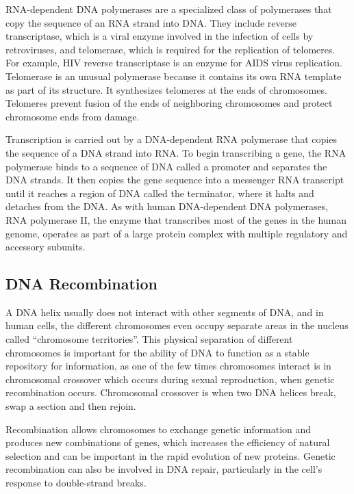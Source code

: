 RNA-dependent DNA polymerases are a specialized class of polymerases that copy the sequence of an RNA strand into DNA. They include reverse transcriptase, which is a viral enzyme involved in the infection of cells by retroviruses, and telomerase, which is required for the replication of telomeres. For example, HIV reverse transcriptase is an enzyme for AIDS virus replication. Telomerase is an unusual polymerase because it contains its own RNA template as part of its structure. It synthesizes telomeres at the ends of chromosomes. Telomeres prevent fusion of the ends of neighboring chromosomes and protect chromosome ends from damage.

Transcription is carried out by a DNA-dependent RNA polymerase that copies the sequence of a DNA strand into RNA. To begin transcribing a gene, the RNA polymerase binds to a sequence of DNA called a promoter and separates the DNA strands. It then copies the gene sequence into a messenger RNA transcript until it reaches a region of DNA called the terminator, where it halts and detaches from the DNA. As with human DNA-dependent DNA polymerases, RNA polymerase II, the enzyme that transcribes most of the genes in the human genome, operates as part of a large protein complex with multiple regulatory and accessory subunits.

\hypertarget{dna-recombination}{%
\subsection{DNA Recombination}\label{dna-recombination}}

A DNA helix usually does not interact with other segments of DNA, and in human cells, the different chromosomes even occupy separate areas in the nucleus called ``chromosome territories''. This physical separation of different chromosomes is important for the ability of DNA to function as a stable repository for information, as one of the few times chromosomes interact is in chromosomal crossover which occurs during sexual reproduction, when genetic recombination occurs. Chromosomal crossover is when two DNA helices break, swap a section and then rejoin.

Recombination allows chromosomes to exchange genetic information and produces new combinations of genes, which increases the efficiency of natural selection and can be important in the rapid evolution of new proteins. Genetic recombination can also be involved in DNA repair, particularly in the cell's response to double-strand breaks.

